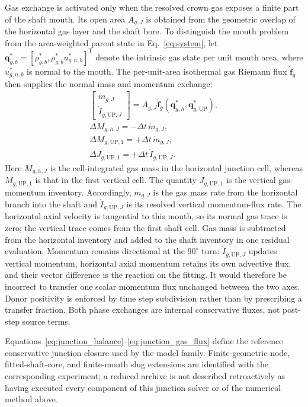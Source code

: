 Gas exchange is activated only when the resolved crown gas exposes a finite
part of the shaft mouth.  Its open area $A_{g,J}$ is obtained from the geometric
overlap of the horizontal gas layer and the shaft bore.  To distinguish the
mouth problem from the area-weighted parent state in Eq.~\eqref{eq:system}, let
$\mathbf q_{g,b}^*=[\rho_{g,b}^*,\rho_{g,b}^*u_{g,n,b}^*]^{\mathsf T}$ denote
the intrinsic gas state per unit mouth area, where $u_{g,n,b}^*$ is normal to
the mouth.  The per-unit-area isothermal gas Riemann flux
$\widehat{\mathbf f}_g$ then supplies the normal mass and momentum exchange:
\begin{equation}
\begin{gathered}
\begin{bmatrix}\dot m_{g,J}\\ \dot I_{g,\mathrm{UP},J}\end{bmatrix}
=A_{g,J}\widehat{\mathbf f}_g
 \left(\mathbf q_{g,h}^*,\mathbf q_{g,\mathrm{UP}}^*\right),\\[3pt]
\Delta M_{g,h,J}=-\Delta t\,\dot m_{g,J},\\[3pt]
\Delta M_{g,\mathrm{UP},1}=+\Delta t\,\dot m_{g,J},\\[3pt]
\Delta J_{g,\mathrm{UP},1}=+\Delta t\,\dot I_{g,\mathrm{UP},J}.
\end{gathered}
\label{eq:junction_gas_flux}
\end{equation}
Here $M_{g,h,J}$ is the cell-integrated gas mass in the horizontal junction
cell, whereas $M_{g,\mathrm{UP},1}$ is that in the first vertical cell.
The quantity $J_{g,\mathrm{UP},1}$ is the vertical gas-momentum inventory.
Accordingly,
$\dot m_{g,J}$ is the gas mass rate from the horizontal branch into the shaft
and $\dot I_{g,\mathrm{UP},J}$ is its resolved vertical momentum-flux rate.
The horizontal axial velocity is tangential to this mouth, so its normal gas
trace is zero; the vertical trace comes from the first shaft cell.  Gas mass is
subtracted from the horizontal inventory and added to the shaft inventory in
one residual evaluation.  Momentum remains directional at the $90^{\circ}$
turn: $\dot I_{g,\mathrm{UP},J}$ updates vertical momentum, horizontal axial momentum
retains its own advective flux, and their vector difference is the reaction on
the fitting.  It would therefore be incorrect to transfer one scalar momentum
flux unchanged between the two axes.  Donor positivity is enforced by time
step subdivision rather than by prescribing a transfer fraction.  Both phase
exchanges are internal conservative fluxes, not post-step source terms.

Equations~\eqref{eq:junction_balance}--\eqref{eq:junction_gas_flux} define the
reference conservative junction closure used by the model family.
Finite-geometric-node, fitted-shaft-core, and finite-mouth slug extensions are
identified with the corresponding experiment; a reduced archive is not
described retroactively as having executed every component of this junction
solver or of the numerical method above.
